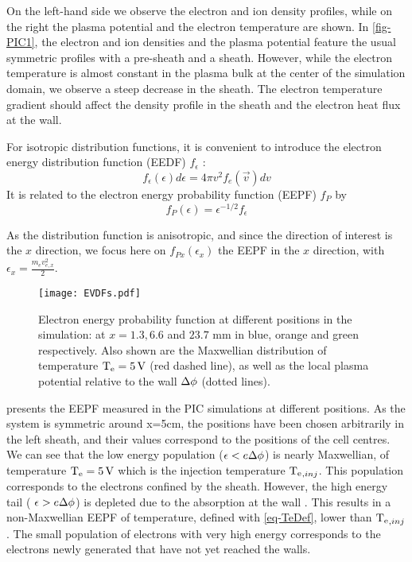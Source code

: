     On the left-hand side we observe the electron and ion density profiles, while on the right the plasma potential and the electron temperature are shown.
    In \cref{fig-PIC1}, the electron and ion densities and the plasma potential feature the usual symmetric profiles with a pre-sheath and a sheath.
    However, while the electron temperature is almost constant in the plasma bulk at the center of the simulation domain, we observe a steep decrease in the sheath.
    The electron temperature gradient should affect the density profile in the sheath and the electron heat flux at the wall.

    \vspace{1em}
    For isotropic distribution functions, it is convenient to introduce the electron energy distribution function (EEDF) $f_{\epsilon}$ \citep{chabert2011}:
    \begin{equation}
    f_{\epsilon}(\epsilon) d\epsilon = 4 \pi v^2 f_e(\vec{v}) dv
    \end{equation}
    It is related to the electron energy probability function (EEPF) $f_{P}$ by
    \begin{equation}
    f_{P}(\epsilon) = \epsilon^{-1/2} f_{\epsilon}
    \end{equation}

    As the distribution function is anisotropic, and since the direction of interest is the $x$ direction, we focus here on $f_{P x}(\epsilon_x)$ the EEPF in the $x$ direction, with $\epsilon_x = \frac{m_e v_{e,x}^2}{2}$.


    \begin{figure}[!htbp]
      \centering
      \texttt{[image: EVDFs.pdf]}
      \caption{Electron energy probability function at different positions in the simulation: at $x=1.3,6.6$ and $23.7$ mm in blue, orange and green respectively. Also shown are the Maxwellian distribution of temperature $\mathrm{T_e}=5{\mathrm{\,V}}$ (red dashed line), as well as the local plasma potential relative to the wall $\Delta \phi$ (dotted lines). }

      \label{fig-PIC2}
    \end{figure}

     presents the EEPF measured in the PIC simulations at different positions.
    As the system is symmetric around x=5cm, the positions have been chosen arbitrarily in the left sheath, and their values correspond to the positions of the cell centres.
    We can see that the low energy population ($\epsilon < e \Delta \phi$) is nearly Maxwellian, of temperature $\mathrm{T_e} = 5{\mathrm{\,V}}$ which is the injection temperature $\mathrm{T_e}_{, inj}$.
    This population corresponds to the electrons confined by the sheath.
    However, the high energy tail ( $\epsilon > e\Delta \phi$) is depleted due to the absorption at the wall \citep{meige2006a,kaganovich2007,lafleur2011}.
    This results in a  non-Maxwellian EEPF of temperature, defined with \cref{eq-TeDef}, lower than $\mathrm{T_e}_{, inj}$.
    The small population of electrons with very high energy corresponds to the electrons newly generated that have not yet reached the walls.



